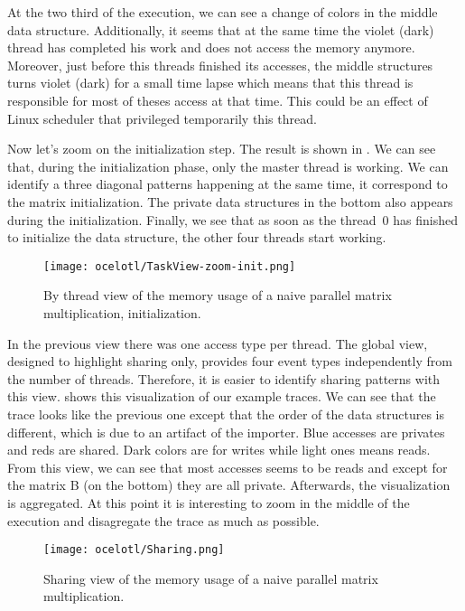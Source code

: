 At the two third of the execution, we can see a change of colors in the middle data structure.
Additionally, it seems that at the same time the violet (dark) thread has completed his work and does not access the memory anymore.
Moreover, just before this threads finished its accesses, the middle structures turns violet (dark) for a small time lapse which means that this thread is responsible for most of theses access at that time.
This could be an effect of Linux scheduler that privileged temporarily this thread.

Now let's zoom on the initialization step.
The result is shown in .
We can see that, during the initialization phase, only the master thread is working.
We can identify a three diagonal patterns happening at the same time, it correspond to the matrix initialization.
The private data structures in the bottom also appears during the initialization.
Finally, we see that as soon as the thread~$0$ has finished to initialize the data structure, the other four threads start working.

\begin{figure}[htb]
    \centering
    \texttt{[image: ocelotl/TaskView-zoom-init.png]}
    \caption{By thread view of the memory usage of a naive parallel matrix multiplication,
    initialization.}
    \label{fig:ocelotl-th1}
\end{figure}

In the previous view there was one access type per thread.
The global view, designed to highlight sharing only, provides four event types independently from the number of threads.
Therefore, it is easier to identify sharing patterns with this view.
 shows this visualization of our example traces.
We can see that the trace looks like the previous one except that the order of the data structures is different, which is due to an artifact of the importer.
Blue accesses are privates and reds are shared.
Dark colors are for writes while light ones means reads.
From this view, we can see that most accesses seems to be reads and except for the matrix B (on the bottom) they are all private.
Afterwards, the visualization is aggregated.
At this point it is interesting to zoom in the middle of the execution and disagregate the trace as much as possible.

\begin{figure}[htb]
    \centering
    \texttt{[image: ocelotl/Sharing.png]}
    \caption{Sharing view of the memory usage of a naive parallel matrix multiplication.}
    \label{fig:ocelotl-carto0}
\end{figure}

